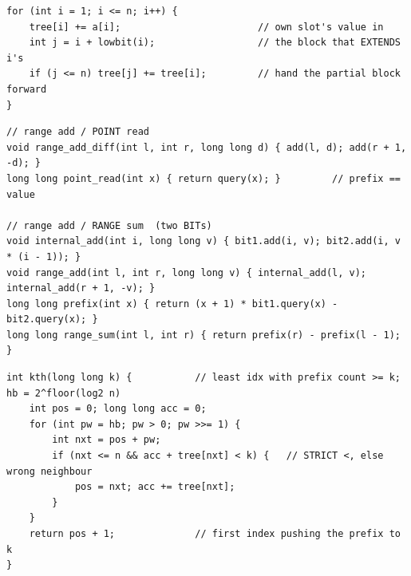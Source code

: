 \begin{lstlisting}[caption={Drill 2 -- O(n) linear build (from lst:c14-build)}]
for (int i = 1; i <= n; i++) {
    tree[i] += a[i];                        // own slot's value in
    int j = i + lowbit(i);                  // the block that EXTENDS i's
    if (j <= n) tree[j] += tree[i];         // hand the partial block forward
}
\end{lstlisting}

\begin{lstlisting}[caption={Drill 3 -- difference BIT + two-BIT range sum (from lst:c14-diff-build / lst:c14-twobit)}]
// range add / POINT read
void range_add_diff(int l, int r, long long d) { add(l, d); add(r + 1, -d); }
long long point_read(int x) { return query(x); }         // prefix == value

// range add / RANGE sum  (two BITs)
void internal_add(int i, long long v) { bit1.add(i, v); bit2.add(i, v * (i - 1)); }
void range_add(int l, int r, long long v) { internal_add(l, v); internal_add(r + 1, -v); }
long long prefix(int x) { return (x + 1) * bit1.query(x) - bit2.query(x); }
long long range_sum(int l, int r) { return prefix(r) - prefix(l - 1); }
\end{lstlisting}

\begin{lstlisting}[caption={Drill 4 -- k-th by binary lifting (from lst:c14-kth)}]
int kth(long long k) {           // least idx with prefix count >= k; hb = 2^floor(log2 n)
    int pos = 0; long long acc = 0;
    for (int pw = hb; pw > 0; pw >>= 1) {
        int nxt = pos + pw;
        if (nxt <= n && acc + tree[nxt] < k) {   // STRICT <, else wrong neighbour
            pos = nxt; acc += tree[nxt];
        }
    }
    return pos + 1;              // first index pushing the prefix to k
}
\end{lstlisting}

